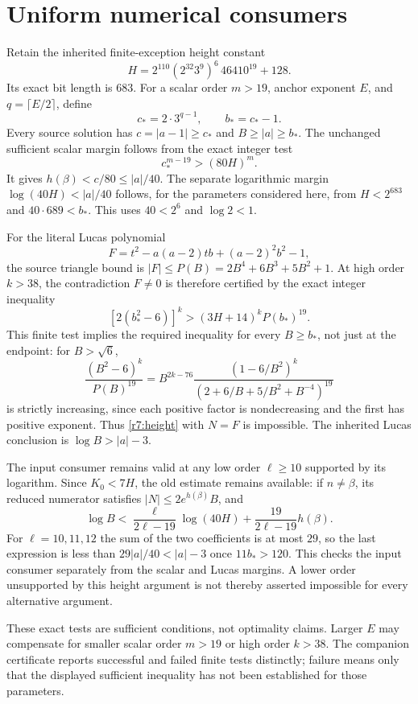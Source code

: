 \section{Uniform numerical consumers}

Retain the inherited finite-exception height constant
\[
 H=2^{110}(2^{32}3^9)^6\,46410^{19}+128.
\]
Its exact bit length is $683$.  For a scalar order $m>19$, anchor
exponent $E$, and $q=\lceil E/2\rceil$, define
\[
 c_*=2\cdot3^{q-1},\qquad b_*=c_*-1.
\]
Every source solution has $c=|a-1|\ge c_*$ and $B\ge|a|\ge b_*$.
The unchanged sufficient scalar margin follows from the exact integer
test
\begin{equation}\label{r7:scalar-test}
 c_*^{m-19}>(80H)^m.
\end{equation}
It gives $h(\beta)<c/80\le|a|/40$.  The separate logarithmic margin
$\log(40H)<|a|/40$ follows, for the parameters considered here, from
$H<2^{683}$ and $40\cdot689<b_*$.  This uses $40<2^6$ and
$\log2<1$.

For the literal Lucas polynomial
\[
 F=t^2-a(a-2)tb+(a-2)^2b^2-1,
\]
the source triangle bound is
$|F|\le P(B)=2B^4+6B^3+5B^2+1$.
At high order $k>38$, the contradiction $F\ne0$ is therefore certified
by the exact integer inequality
\begin{equation}\label{r7:lucas-test}
 [2(b_*^2-6)]^k>(3H+14)^k P(b_*)^{19}.
\end{equation}
This finite test implies the required inequality for every $B\ge b_*$,
not just at the endpoint: for $B>\sqrt6$,
\[
 \frac{(B^2-6)^k}{P(B)^{19}}
 =B^{2k-76}
   \frac{(1-6/B^2)^k}{(2+6/B+5/B^2+B^{-4})^{19}}
\]
is strictly increasing, since each positive factor is nondecreasing and
the first has positive exponent.  Thus \eqref{r7:height} with $N=F$
is impossible.  The inherited Lucas conclusion is
$\log B>|a|-3$.

The input consumer remains valid at any low order $\ell\ge10$ supported
by its logarithm.  Since $K_0<7H$, the old estimate remains available:
if $n\ne\beta$, its reduced numerator satisfies
$|N|\le2e^{h(\beta)}B$, and
\[
 \log B<\frac{\ell}{2\ell-19}\log(40H)
             +\frac{19}{2\ell-19}h(\beta).
\]
For $\ell=10,11,12$ the sum of the two coefficients is at most $29$,
so the last expression is less than $29|a|/40<|a|-3$ once
$11b_*>120$.  This checks the input consumer separately from the
scalar and Lucas margins.  A lower order unsupported by this height
argument is not thereby asserted impossible for every alternative
argument.

These exact tests are sufficient conditions, not optimality claims.
Larger $E$ may compensate for smaller scalar order $m>19$ or high
order $k>38$.  The companion certificate reports successful and failed
finite tests distinctly; failure means only that the displayed
sufficient inequality has not been established for those parameters.


